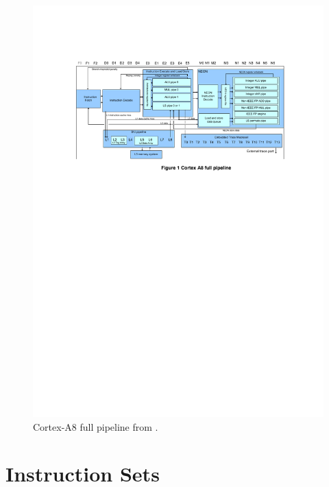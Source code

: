 \documentclass[oneside,a4paper]{report}
\begin{document}
\begin{figure}[htb]
	\centering
	\includegraphics[width=1.0\textwidth]{./fig/Pipeline.pdf}
	\caption{Cortex-A8 full pipeline from \cite[p. 3]{Williamson}.}
	\label{fig:pipeline}
\end{figure}

\section{Instruction Sets}
\end{document}
